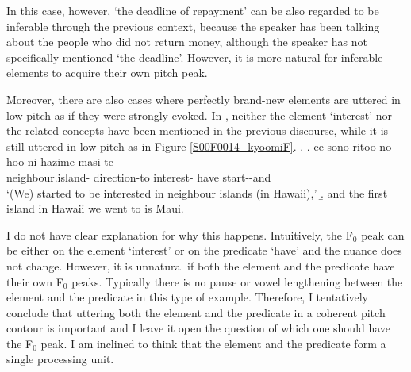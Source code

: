 In this case, however,
 `the deadline of repayment' can be also regarded to be inferable through the previous context,
because the speaker has been talking about the people who did not return money,
although the speaker has not specifically mentioned  `the deadline'.
However, it is more natural for inferable elements
to acquire their own pitch peak.

Moreover,
there are also cases where perfectly brand-new elements are uttered in low pitch as if they were strongly evoked.
In \Next,
neither the element  `interest' nor the related concepts have been mentioned in the previous discourse,
while it is still uttered in low pitch as in Figure \ref{S00F0014_kyoomiF}.
%
\ex.\label{S00F0014_kyoomi}
 \ag. ee sono ritoo-no \tp{\dvline} hoo-ni  \tp{\dvline}  hazime-masi-te \tp{\dvline} \\
        neighbour.island- {} direction-to interest- {} have start--and {} \\
      `(We) started to be interested in neighbour islands (in Hawaii),'
 \b. and the first island in Hawaii we went to is Maui.

I do not have clear explanation for why this happens.
Intuitively, the F$_{0}$ peak can be either on the element  `interest' or on the predicate  `have'
and the nuance does not change.
However, it is unnatural if both the element and the predicate have their own F$_{0}$ peaks.
Typically there is no pause or vowel lengthening between the element and the predicate in this type of example.
Therefore, I tentatively conclude that uttering both the element and the predicate in a coherent pitch contour is important and I leave it open the question of which one should have the F$_{0}$ peak.
I am inclined to think that the element and the predicate form a single processing unit.

